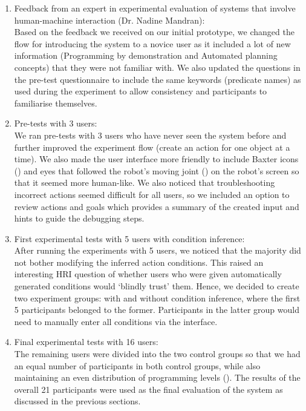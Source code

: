 \begin{enumerate}
	\item {Feedback from an expert in experimental evaluation of systems that involve human-machine interaction (Dr. Nadine Mandran):\\
		Based on the feedback we received on our initial prototype, we changed the flow for introducing the system to a novice user as it included a lot of new information (\eg Programming by demonstration and Automated planning concepts) that they were not familiar with.
		We also updated the questions in the pre-test questionnaire to include the same keywords (\ie predicate names) as used during the experiment to allow consistency and participants to familiarise themselves.
	}
	\item {Pre-tests with 3 users:\\
		We ran pre-tests with 3 users who have never seen the system before and further improved the experiment flow (\eg create an action for one object at a time).
		We also made the user interface more friendly to include Baxter icons () and eyes that followed the robot's moving joint (\cite{baxtereyes}) on the robot's screen so that it seemed more human-like.
		We also noticed that troubleshooting incorrect actions seemed difficult for all users, so we included an option to review actions and goals which provides a summary of the created input and hints to guide the debugging steps.}
	\item {First experimental tests with 5 users with condition inference:\\
		After running the experiments with 5 users, we noticed that the majority did not bother modifying the inferred action conditions.
		This raised an interesting HRI question of whether users who were given automatically generated conditions would `blindly trust' them.
		Hence, we decided to create two experiment groups: with and without condition inference, where the first 5 participants belonged to the former.
		Participants in the latter group would need to manually enter all conditions via the interface. }
	\item {Final experimental tests with 16 users: \\
		The remaining users were divided into the two control groups so that we had an equal number of participants in both control groups, while also maintaining an even distribution of programming levels ().
		The results of the overall 21 participants were used as the final evaluation of the system as discussed in the previous sections.
	}
\end{enumerate}

